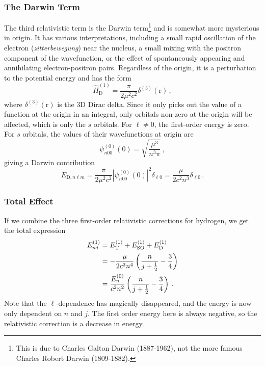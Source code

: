 \documentclass{article}
\theoremstyle{plain}\theoremheaderfont{\normalfont\itshape}\theorembodyfont{\rmfamily}\theoremseparator{.}\newtheorem*{rem}{Remark}\newtheorem*{ex}{Example}\newtheorem*{proof}{Proof}\newtheorem*{altp}{Alternative proof}
\theoremstyle{plain}\theoremheaderfont{\normalfont\bfseries}\theorembodyfont{\rmfamily}\theoremseparator{.}\newtheorem{thm}{Theorem}[section]\newtheorem{lem}[thm]{Lemma}\newtheorem{prop}[thm]{Proposition}\newtheorem*{cor}{Corollary}\newtheorem{defn}[thm]{Definition}\newtheorem{clm}[thm]{Claim}\newtheorem{clminproof}{Claim}
\theoremstyle{break}\theoremheaderfont{\normalfont\itshape}\theorembodyfont{\rmfamily}\theoremseparator{.\medskip}\newtheorem*{proofskip}{Proof}\newtheorem*{exs}{Examples}\newtheorem*{rems}{Remarks}
\theoremstyle{break}\theoremheaderfont{\normalfont\bfseries}\theorembodyfont{\rmfamily}\theoremseparator{.\medskip}\newtheorem{lemskip}[thm]{Lemma}\newtheorem{defnskip}[thm]{Definition}\newtheorem{propskip}[thm]{Proposition}\newtheorem{thmskip}[thm]{Theorem}
\numberwithin{equation}{section}
\newcommand{\vb}[1]{\bm{\mathrm{#1}}}
\newcommand{\abs}[1]{\left| #1 \right|}
\begin{document}
    \subsubsection{The Darwin Term}
    The third relativistic term is the Darwin term\footnote{This is due to Charles Galton Darwin (1887-1962), not the more famous Charles Robert Darwin (1809-1882).} and is somewhat more mysterious in origin. It has various interpretations, including a small rapid oscillation of the electron (\textit{zitterbewegung}) near the nucleus, a small mixing with the positron component of the wavefunction, or the effect of spontaneously appearing and annihilating electron-positron pairs. Regardless of the origin, it is a perturbation to the potential energy and has the form
    \begin{equation}
        \hat{H}_{\text{D}}^{(1)}=\frac{\pi}{2\mu^2 c^2}\delta^{(3)}(\vb{r})\,,
    \end{equation}
    where \(\delta^{(3)}(\vb{r})\) is the 3D Dirac delta. Since it only picks out the value of a function at the origin in an integral, only orbitals non-zero at the origin will be affected, which is only the \(s\) orbitals. For \(\ell\ne 0\), the first-order energy is zero. For \(s\) orbitals, the values of their wavefunctions at origin are
    \begin{equation}
        \psi_{n00}^{(0)}(\vb{0})=\sqrt{\frac{\mu^3}{n^3\pi}}\,,
    \end{equation}
    giving a Darwin contribution
    \begin{equation}
        E_{\text{D},n\ell m}=\frac{\pi}{2\mu^2 c^2}\abs{\psi_{n00}^{(0)}(\vb{0})}^2\delta_{\ell 0}=\frac{\mu}{2c^2n^3}\delta_{\ell 0}\,.
    \end{equation}

    \subsubsection{Total Effect}
    If we combine the three first-order relativistic corrections for hydrogen, we get the total expression
    \begin{align}
        E_{nj}^{(1)}&=E_{\text{T}}^{(1)}+E_{\text{SO}}^{(1)}+E_{\text{D}}^{(1)}\notag \\
        &=-\frac{\mu}{2c^2n^4}\left(\frac{n}{j+\frac{1}{2}}-\frac{3}{4}\right)\notag \\
        &=\frac{E_n^{(0)}}{c^2 n^2}\left(\frac{n}{j+\frac{1}{2}}-\frac{3}{4}\right)\,.\label{fine_structure}
    \end{align}
    Note that the \(\ell\)-dependence has magically disappeared, and the energy is now only dependent on \(n\) and \(j\). The first order energy here is always negative, so the relativistic correction is a decrease in energy.
\end{document}
